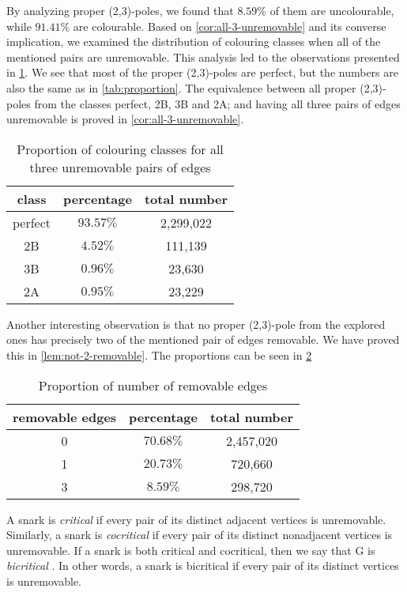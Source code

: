 By analyzing proper (2,3)-poles, we found that $8.59\%$ of them are uncolourable, while $91.41\%$ are colourable. Based on \cref{cor:all-3-unremovable} and its converse implication, we examined the distribution of colouring classes when all of the mentioned pairs are unremovable. This analysis led to the observations presented in \cref{tab:proportion-all-unremovable}. We see that most of the proper (2,3)-poles are perfect, but the numbers are also the same as in \cref{tab:proportion}. The equivalence between all proper (2,3)-poles from the classes perfect, 2B, 3B and 2A; and having all three pairs of edges unremovable is proved in \cref{cor:all-3-unremovable}.

\begin{table}[h!]
	\centering
	\begin{tabular}{ |c|c|c| } 
		\hline
		class & percentage & total number \\ [0.5ex] 
		\hline\hline
		perfect & $93.57\%$ & 2,299,022 \\ 
		\hline
		2B & $4.52\%$ & 111,139 \\ 
		\hline
		3B & $0.96\%$ & 23,630 \\ 
		\hline
		2A & $0.95\%$ & 23,229 \\ 
		\hline
	\end{tabular}
	\caption{Proportion of colouring classes for all three unremovable pairs of edges}
	\label{tab:proportion-all-unremovable}
\end{table}

Another interesting observation is that no proper (2,3)-pole from the explored ones has precisely two of the mentioned pair of edges removable. We have proved this in \cref{lem:not-2-removable}. The proportions can be seen in \cref{tab:removable-edges}

\begin{table}[h!]
	\centering
	\begin{tabular}{ |c|c|c| } 
		\hline
		removable edges & percentage & total number \\ [0.5ex] 
		\hline\hline
		0 & $70.68\%$ & 2,457,020 \\ 
		\hline
		1 & $20.73\%$ & 720,660 \\ 
		\hline
		3 & $8.59\%$ & 298,720 \\ 
		\hline
	\end{tabular}
	\caption{Proportion of number of removable edges}
	\label{tab:removable-edges}
\end{table}

A snark is \textit{critical} if every pair of its distinct adjacent vertices is unremovable. Similarly, a snark is \textit{cocritical} if every pair of its distinct nonadjacent vertices is unremovable. If a snark is both critical and cocritical, then we say that G is \textit{bicritical} \cite{Nedela1996}. In other words, a snark is bicritical if every pair of its distinct vertices is unremovable.

